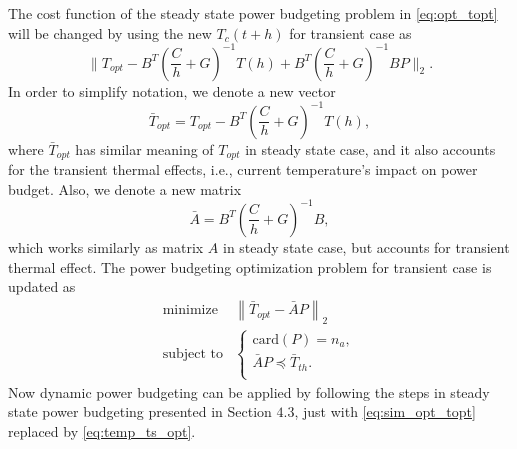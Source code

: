 The cost function of the steady state power budgeting problem in
\eqref{eq:opt_topt} will be changed by using the new $T_c(t+h)$ for
transient case as
\begin{equation}\label{eq:cost_trans}
\|T_{opt} -  B^{T}(\frac{C}{h}+G)^{-1}T(h)+B^{T}(\frac{C}{h}+G)^{-1}BP\|_2.
\end{equation}
In order to simplify notation, we denote a new vector  
\begin{equation}
\bar{T}_{opt}=T_{opt} - B^{T}(\frac{C}{h}+G)^{-1}T(h),
\end{equation}
where $\bar{T}_{opt}$ has similar meaning of
$T_{opt}$ in steady state case, and it also accounts for the transient
thermal effects, i.e., current temperature's impact on power
budget. Also, we denote a new matrix 
\begin{equation}
\bar{A} = B^{T}(\frac{C}{h}+G)^{-1}B, 
\end{equation}
which works similarly as matrix $A$ in steady
state case, but accounts for transient thermal effect. The power
budgeting optimization problem for transient case is updated as 
\begin{equation}\label{eq:temp_ts_opt}
\begin{split}
\text{minimize } &  \left \| \bar{T}_{opt}-\bar{A}P \right \|_{2}\\
\text{subject to} &\left\{
\begin{array}{lr}
\text{card}(P) = n_{a},\\
\bar{A}P \preceq \bar{T}_{th}.\\
\end{array}
\right.
\end{split}
\end{equation}
Now dynamic power budgeting can be
applied by following the steps in steady state power budgeting presented in
Section $4.3$, just with \eqref{eq:sim_opt_topt} replaced
by \eqref{eq:temp_ts_opt}.